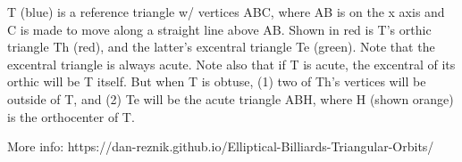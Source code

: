 T (blue) is a reference triangle w/ vertices ABC, where AB is on the x axis and C is made to move along a straight line above AB. Shown in red is T's orthic triangle Th (red), and the latter's excentral triangle Te (green). Note that the excentral triangle is always acute. Note also that if T is acute, the excentral of its orthic will be T itself. But when T is obtuse, (1) two of Th's vertices will be outside of T, and (2) Te will be the acute triangle ABH, where H (shown orange) is the orthocenter of T.

More info: https://dan-reznik.github.io/Elliptical-Billiards-Triangular-Orbits/